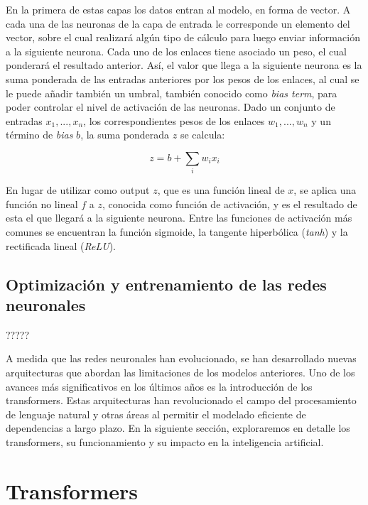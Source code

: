 \documentclass[11pt,spanish,listoffigures,listoftables]{tfgetsinf}
\begin{document}
En la primera de estas capas los datos entran al modelo, en forma de vector. A cada una de las neuronas de la capa de entrada le corresponde un elemento del vector, sobre el cual realizará algún tipo de cálculo para luego enviar información a la siguiente neurona. Cada uno de los enlaces tiene asociado un peso, el cual ponderará el resultado anterior. Así, el valor que llega a la siguiente neurona es la suma ponderada de las entradas anteriores por los pesos de los enlaces, al cual se le puede añadir también un umbral, también conocido como \textit{bias term}, para poder controlar el nivel de activación de las neuronas. Dado un conjunto de entradas $x_1, ..., x_n$, los correspondientes pesos de los enlaces $w_1, ..., w_n$ y un término de \textit{bias} $b$, la suma ponderada $z$ se calcula:

\begin{equation}
z = b + \sum_i w_i x_i
\end{equation}

En lugar de utilizar como output $z$, que es una función lineal de $x$, se aplica una función no lineal $f$ a $z$, conocida como función de activación, y es el resultado de esta el que llegará a la siguiente neurona. Entre las funciones de activación más comunes se encuentran la función sigmoide, la tangente hiperbólica (\textit{tanh}) y la rectificada lineal (\textit{ReLU}).


\subsection{Optimización y entrenamiento de las redes neuronales}

?????

A medida que las redes neuronales han evolucionado, se han desarrollado nuevas arquitecturas que abordan las limitaciones de los modelos anteriores. Uno de los avances más significativos en los últimos años es la introducción de los transformers. Estas arquitecturas han revolucionado el campo del procesamiento de lenguaje natural y otras áreas al permitir el modelado eficiente de dependencias a largo plazo. En la siguiente sección, exploraremos en detalle los transformers, su funcionamiento y su impacto en la inteligencia artificial.

\section{Transformers}
\end{document}
